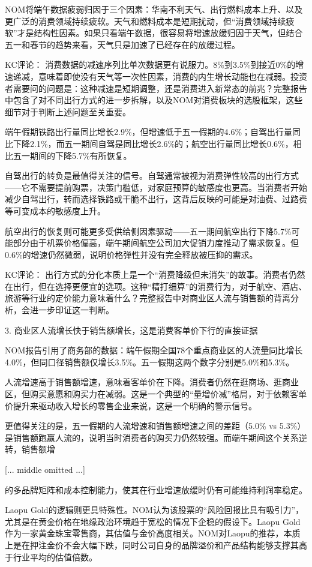 \documentclass[11pt]{ctexart}
\begin{document}
NOM将端午数据疲弱归因于三个因素：华南不利天气、出行燃料成本上升、以及更广泛的消费领域持续疲软。天气和燃料成本是短期扰动，但“消费领域持续疲软”才是结构性因素。如果只看端午数据，很容易将增速放缓归因于天气，但结合五一和春节的趋势来看，天气只是加速了已经存在的放缓过程。

KC评论： 消费数据的减速序列比单次数据更有说服力。8\%到3.5\%到接近0\%的增速递减，意味着即使没有天气等一次性因素，消费的内生增长动能也在减弱。投资者需要问的问题是：这种减速是短期调整，还是消费进入新常态的前兆？完整报告中包含了对不同出行方式的进一步拆解，以及NOM对消费板块的选股框架，这些细节对于判断上述问题至关重要。

端午假期铁路出行量同比增长2.9\%，但增速低于五一假期的4.6\%；自驾出行量同比下降2.1\%，而五一期间自驾是同比增长2.6\%的；航空出行量同比增长0.6\%，相比五一期间的下降5.7\%有所恢复。

自驾出行的转负是最值得关注的信号。自驾通常被视为消费弹性较高的出行方式——它不需要提前购票，决策门槛低，对家庭预算的敏感度也更高。当消费者开始减少自驾出行，转而选择铁路或干脆不出行，这背后反映的可能是对油费、过路费等可变成本的敏感度上升。

航空出行的恢复则可能更多受供给侧因素驱动——五一期间航空出行下降5.7\%可能部分由于机票价格偏高，端午期间航空公司加大促销力度推动了需求恢复。但0.6\%的增速仍然微弱，说明价格弹性并没有完全释放被压抑的需求。

KC评论： 出行方式的分化本质上是一个“消费降级但未消失”的故事。消费者仍然在出行，但在选择更便宜的选项。这种“精打细算”的消费行为，对于航空、酒店、旅游等行业的定价能力意味着什么？完整报告中对商业区人流与销售额的背离分析，会进一步印证这一判断。

3. 商业区人流增长快于销售额增长，这是消费客单价下行的直接证据

NOM报告引用了商务部的数据：端午假期全国78个重点商业区的人流量同比增长4.0\%，但同口径销售额仅增长3.5\%。五一假期这两个数字分别是5.0\%和5.3\%。

人流增速高于销售额增速，意味着客单价在下降。消费者仍然在逛商场、逛商业区，但购买意愿和购买力在减弱。这是一个典型的“量增价减”格局，对于依赖客单价提升来驱动收入增长的零售企业来说，这是一个明确的警示信号。

更值得关注的是，五一假期的人流增速和销售额增速之间的差距（5.0\% vs 5.3\%）是销售额跑赢人流的，说明当时消费者的购买力仍然较强。而端午期间这个关系逆转，销售额增

[... middle omitted ...]

的多品牌矩阵和成本控制能力，使其在行业增速放缓时仍有可能维持利润率稳定。

Laopu Gold的逻辑则更具特殊性。NOM认为该股票的“风险回报比具有吸引力”，尤其是在黄金价格在地缘政治环境趋于宽松的情况下企稳的假设下。Laopu Gold作为一家黄金珠宝零售商，其估值与金价高度相关。NOM对Laopu的推荐，本质上是在押注金价不会大幅下跌，同时公司自身的品牌溢价和产品结构能够支撑其高于行业平均的估值倍数。
\end{document}
